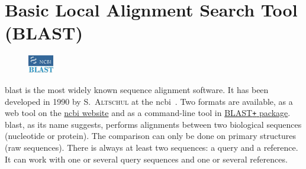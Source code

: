 \section{Basic Local Alignment Search Tool (BLAST)}\label{sec:blast}
\begin{figure}
    \vspace{-1.2em}
    \includegraphics[width=0.1\textwidth]{img/blast}
\end{figure}

\acrshort{blast} is the most widely known sequence alignment software. It has been developed in 1990 by S.~\textsc{Altschul} at the \gls{ncbi}~\cite{Altschul1990}. Two formats are available, as a web tool on the \href{http://blast.ncbi.nlm.nih.gov/Blast.cgi}{\gls{ncbi} website} and as a command-line tool in \href{ftp://ftp.ncbi.nlm.nih.gov/blast/executables/blast+/LATEST/}{BLAST\texttt{+} package}.
\gls{blast}, as its name suggests, performs alignments between two biological sequences (nucleotide or protein).
The comparison can only be done on primary structures (raw sequences).
There is always at least two sequences: a query and a reference.
It can work with one or several query sequences and one or several references.

